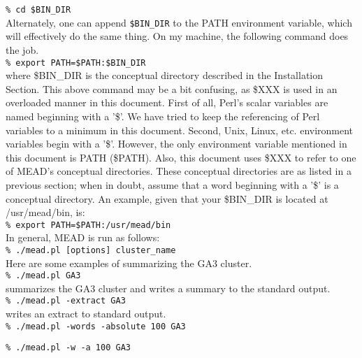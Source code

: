 \documentclass[10pt]{article}
\begin{document}
        \verb|% cd $BIN_DIR|\\

Alternately, one can append \verb|$BIN_DIR| to the PATH environment variable,
which will effectively do the same thing.  On my machine, the 
following command does the job.\\

        \verb|% export PATH=$PATH:$BIN_DIR|\\

where \$BIN\_DIR is the conceptual directory described in the
Installation Section.  
This above command may be a bit confusing, as \$XXX is used
in an overloaded manner in this document.  
First of all, Perl's scalar variables are named beginning with
a '\$'.  We have tried to keep the referencing of Perl
variables to a minimum in this document.
Second, Unix, Linux, etc.
environment variables begin with a '\$'.  However, the only 
environment variable mentioned in this document is PATH (\$PATH).
Also, this document uses \$XXX to refer to one of MEAD's 
conceptual directories.  These conceptual directories are 
as listed in a previous section; when in doubt, assume that a 
word beginning with a '\$' is a conceptual directory.  
An example, given that your 
\$BIN\_DIR is located at /usr/mead/bin, is:\\

        \verb|% export PATH=$PATH:/usr/mead/bin|\\

In general, MEAD is run as follows:\\

        \verb|% ./mead.pl [options] cluster_name|\\

Here are some examples of summarizing the GA3 cluster.\\

        \verb|% ./mead.pl GA3|\\

summarizes the GA3 cluster and writes a summary to the standard output.\\

        \verb|% ./mead.pl -extract GA3|\\

writes an extract to standard output.\\

        \verb|% ./mead.pl -words -absolute 100 GA3|

        \verb|% ./mead.pl -w -a 100 GA3|\\
\end{document}
